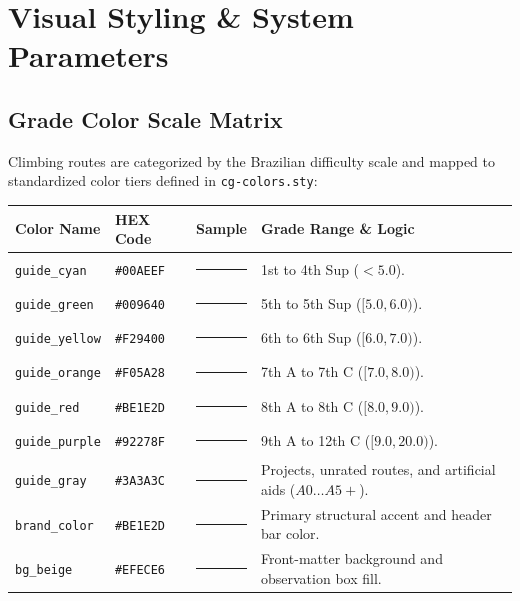 \clearpage
\section{Visual Styling \& System Parameters}

\subsection{Grade Color Scale Matrix}
Climbing routes are categorized by the Brazilian difficulty scale and mapped to standardized color tiers defined in \texttt{cg-colors.sty}:

\vspace{0.5em}
\noindent
{\small
\begin{tabularx}{\linewidth}{@{}llcX@{}}
\toprule
\textbf{Color Name} & \textbf{HEX Code} & \textbf{Sample} & \textbf{Grade Range \& Logic} \\
\midrule
\texttt{guide\_cyan}   & \texttt{\#00AEEF} & \textcolor{guide_cyan}{\rule{14mm}{3mm}}   & 1st to 4th Sup ($< 5.0$). \\
\texttt{guide\_green}  & \texttt{\#009640} & \textcolor{guide_green}{\rule{14mm}{3mm}}  & 5th to 5th Sup ($[5.0, 6.0)$). \\
\texttt{guide\_yellow} & \texttt{\#F29400} & \textcolor{guide_yellow}{\rule{14mm}{3mm}} & 6th to 6th Sup ($[6.0, 7.0)$). \\
\texttt{guide\_orange} & \texttt{\#F05A28} & \textcolor{guide_orange}{\rule{14mm}{3mm}} & 7th A to 7th C ($[7.0, 8.0)$). \\
\texttt{guide\_red}    & \texttt{\#BE1E2D} & \textcolor{guide_red}{\rule{14mm}{3mm}}    & 8th A to 8th C ($[8.0, 9.0)$). \\
\texttt{guide\_purple} & \texttt{\#92278F} & \textcolor{guide_purple}{\rule{14mm}{3mm}} & 9th A to 12th C ($[9.0, 20.0)$). \\
\texttt{guide\_gray}   & \texttt{\#3A3A3C} & \textcolor{guide_gray}{\rule{14mm}{3mm}}   & Projects, unrated routes, and artificial aids ($A0\dots A5+$). \\
\texttt{brand\_color}  & \texttt{\#BE1E2D} & \textcolor{brand_color}{\rule{14mm}{3mm}}  & Primary structural accent and header bar color. \\
\texttt{bg\_beige}     & \texttt{\#EFECE6} & \textcolor{bg_beige}{\rule{14mm}{3mm}}     & Front-matter background and observation box fill. \\
\bottomrule
\end{tabularx}
}

